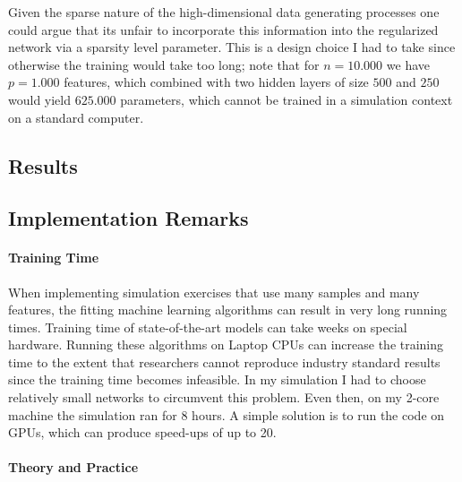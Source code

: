 \begin{remark}
Given the sparse nature of the high-dimensional data generating processes one could
argue that its unfair to incorporate this information into the regularized network via
a sparsity level parameter. This is a design choice I had to take since otherwise the
training would take too long; note that for $n = 10.000$ we have $p = 1.000$ features,
which combined with two hidden layers of size $500$ and $250$ would yield $625.000$
parameters, which cannot be trained in a simulation context on a standard computer.
\end{remark}

\subsection{Results}

\subsection*{Implementation Remarks}

\paragraph{Training Time}

When implementing simulation exercises that use many samples and many features, the
fitting machine learning algorithms can result in very long running times. Training
time of state-of-the-art models can take weeks on special hardware. Running these
algorithms on Laptop CPUs can increase the training time to the extent that researchers
cannot reproduce industry standard results since the training time becomes infeasible.
In my simulation I had to choose relatively small networks to circumvent this problem.
Even then, on my 2-core machine the simulation ran for 8 hours. A simple solution is to
run the code on GPUs, which can produce speed-ups of up to 20.

\paragraph{Theory and Practice}

